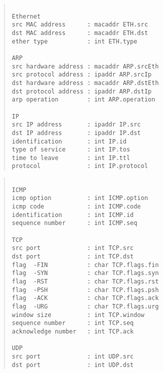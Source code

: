 \documentclass[12pt]{jsarticle}
\begin{document}
\begin{quote}
\begin{verbatim}
	
Ethernet
src MAC address      : macaddr ETH.src
dst MAC address      : macaddr ETH.dst
ether type           : int ETH.type

ARP
src hardware address : macaddr ARP.srcEth
src protocol address : ipaddr ARP.srcIp
dst hardware address : macaddr ARP.dstEth
dst protocol address : ipaddr ARP.dstIp
arp operation        : int ARP.operation

IP
src IP address       : ipaddr IP.src
dst IP address       : ipaddr IP.dst
identification       : int IP.id
type of service      : int IP.tos
time to leave        : int IP.ttl
protocol             : int IP.protocol

\end{verbatim}
\end{quote}

\newpage

\begin{quote}
\begin{verbatim}

ICMP
icmp option          : int ICMP.option
icmp code            : int ICMP.code
identification       : int ICMP.id
sequence number      : int ICMP.seq

TCP
src port             : int TCP.src
dst port             : int TCP.dst
flag  -FIN           : char TCP.flags.fin 
flag  -SYN           : char TCP.flags.syn
flag  -RST           : char TCP.flags.rst
flag  -PSH           : char TCP.flags.psh
flag  -ACK           : char TCP.flags.ack 
flag  -URG           : char TCP.flags.urg 
window size          : int TCP.window
sequence number      : int TCP.seq
acknowledge number   : int TCP.ack

UDP
src port             : int UDP.src
dst port             : int UDP.dst

\end{verbatim}
\end{quote}

\newpage
\end{document}
